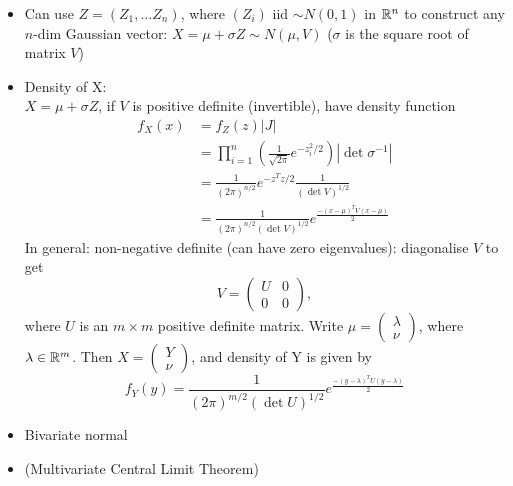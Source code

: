 \begin{itemize}
      \item Can use $Z = (Z_1, \dots Z_n)$, where $(Z_i)$ iid $\sim N(0,1)$ in $\mathbb{R}^n$ to construct any $n$-dim Gaussian vector: $X = \mu + \sigma Z \sim N(\mu, V)$  ($\sigma$ is the square root of matrix $V$)
      \item Density of X: \\
            $X = \mu + \sigma Z$, if $V$ is positive definite (invertible), have density function
            \begin{align*}
                  f_X(x) & = f_Z(z) |J|                                                                          \\
                         & = \prod_{i=1}^n \left( \frac{1}{\sqrt{2\pi}} e^{-z_i^2 /2} \right) |\det \sigma^{-1}| \\
                         & = \frac{1}{(2\pi)^{n/2}} e^{-z^T z/2} \frac{1}{(\det V)^{1/2}}                        \\
                         & = \frac{1}{(2\pi)^{n/2} (\det V)^{1/2} } e^{\frac{-(x-\mu)^T V (x-\mu)}{2}}
            \end{align*}
            In general: non-negative definite (can have zero eigenvalues): diagonalise $V$ to get \[V = \left( \begin{array}{c|c}
                              U        & 0 \\
                              \hline 0 & 0
                        \end{array} \right),\] where $U$ is an $m\times m$ positive definite matrix.
            Write $\mu = \begin{pmatrix} \lambda \\ \nu \end{pmatrix}$, where $\lambda \in \mathbb{R}^m$.
            Then $X = \begin{pmatrix} Y \\ \nu \end{pmatrix}$, and density of Y is given by
            \[ f_Y(y) = \frac{1}{(2\pi)^{m/2} (\det U)^{1/2} } e^{\frac{-(y-\lambda)^T U (y-\lambda)}{2}} \]

      \item Bivariate normal
      \item (Multivariate Central Limit Theorem)
\end{itemize}


